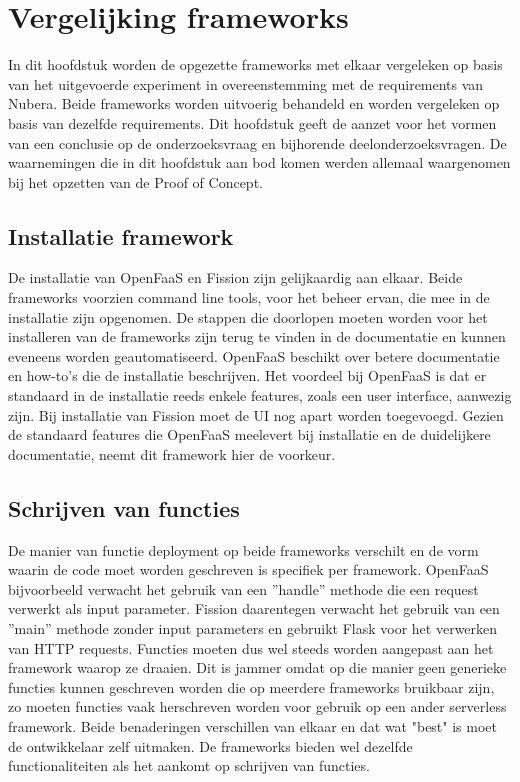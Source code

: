 \chapter{Vergelijking frameworks}
\label{ch:vergelijking-frameworks}
In dit hoofdstuk worden de opgezette frameworks met elkaar vergeleken op basis van het uitgevoerde experiment in overeenstemming met de requirements van Nubera. Beide frameworks worden uitvoerig behandeld en worden vergeleken op basis van dezelfde requirements. Dit hoofdstuk geeft de aanzet voor het vormen van een conclusie op de onderzoeksvraag en bijhorende deelonderzoeksvragen. De waarnemingen die in dit hoofdstuk aan bod komen werden allemaal waargenomen bij het opzetten van de Proof of Concept.

\section{Installatie framework}
\label{sec:vergelijking-installatie}
De installatie van OpenFaaS en Fission zijn gelijkaardig aan elkaar. Beide frameworks voorzien command line tools, voor het beheer ervan, die mee in de installatie zijn opgenomen. De stappen die doorlopen moeten worden voor het installeren van de frameworks zijn terug te vinden in de documentatie en kunnen eveneens worden geautomatiseerd. OpenFaaS beschikt over betere documentatie en how-to's die de installatie beschrijven. Het voordeel bij OpenFaaS is dat er standaard in de installatie reeds enkele features, zoals een user interface, aanwezig zijn. Bij installatie van Fission moet de UI nog apart worden toegevoegd. Gezien de standaard features die OpenFaaS meelevert bij installatie en de duidelijkere documentatie, neemt dit framework hier de voorkeur.

\section{Schrijven van functies}
De manier van functie deployment op beide frameworks verschilt en de vorm waarin de code moet worden geschreven is specifiek per framework. OpenFaaS bijvoorbeeld verwacht het gebruik van een ''handle'' methode die een request verwerkt als input parameter. Fission daarentegen verwacht het gebruik van een ''main'' methode zonder input parameters en gebruikt Flask voor het verwerken van HTTP requests. Functies moeten dus wel steeds worden aangepast aan het framework waarop ze draaien. Dit is jammer omdat op die manier geen generieke functies kunnen geschreven worden die op meerdere frameworks bruikbaar zijn, zo moeten functies vaak herschreven worden voor gebruik op een ander serverless framework. Beide benaderingen verschillen van elkaar en dat wat "best" is moet de ontwikkelaar zelf uitmaken. De frameworks bieden wel dezelfde functionaliteiten als het aankomt op schrijven van functies.

